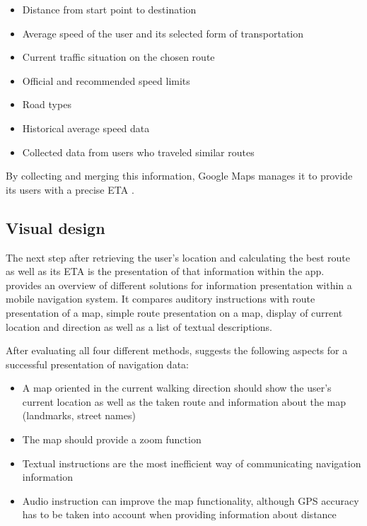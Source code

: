 \begin{itemize}
    \item Distance from start point to destination
    \item Average speed of the user and its selected form of transportation
    \item Current traffic situation on the chosen route
    \item Official and recommended speed limits
    \item Road types
    \item Historical average speed data
    \item Collected data from users who traveled similar routes
\end{itemize}

By collecting and merging this information, Google Maps manages it to provide its users with a precise ETA \cite{google_maps}.

\subsection{Visual design}
The next step after retrieving the user's location and calculating the best route as well as its ETA is the presentation of that information within the app. \cite{visual_design_of_navigation_system} provides an overview of different solutions for information presentation within a mobile navigation system. It compares auditory instructions with route presentation of a map, simple route presentation on a map, display of current location and direction as well as a list of textual descriptions.

After evaluating all four different methods, \cite{visual_design_of_navigation_system} suggests the following aspects for a successful presentation of navigation data:

\begin{itemize}
    \item A map oriented in the current walking direction should show the user's current location as well as the taken route and information about the map (landmarks, street names)
    \item The map should provide a zoom function
    \item Textual instructions are the most inefficient way of communicating navigation information
    \item Audio instruction can improve the map functionality, although GPS accuracy has to be taken into account when providing information about distance
\end{itemize}

